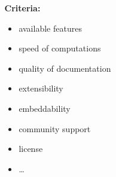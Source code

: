 \documentclass[10pt]{beamer}
\begin{document}
\begin{frame}[fragile]
\begin{columns}
\begin{column}[l]{0.4\textwidth}
\begin{center}
            \end{center}
        \end{column}
        \begin{column}[l]{0.4\textwidth}
            \textbf{Criteria:}
            \begin{itemize}
                \item available features
                \item speed of computations
                \item quality of documentation
                \item extensibility
                \item embeddability
                \item community support
                \item license
                \item \ldots
            \end{itemize}
        \end{column}
    \end{columns}
\end{frame}
\end{document}
